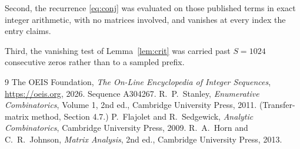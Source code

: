 \documentclass[11pt,a4paper]{article}
\theoremstyle{plain}
\theoremstyle{definition}
\begin{document}
Second, the recurrence \eqref{eq:conj} was evaluated on those published terms in exact
integer arithmetic, with no matrices involved, and vanishes at every index the entry claims.

Third, the vanishing test of Lemma~\ref{lem:crit} was carried past $S=1024$ consecutive
zeros rather than to a sampled prefix.

\begin{thebibliography}{9}
 The OEIS Foundation, \emph{The On-Line Encyclopedia of Integer
Sequences}, \url{https://oeis.org}, 2026. Sequence A304267.
 R.~P.~Stanley, \emph{Enumerative Combinatorics}, Volume 1, 2nd ed.,
Cambridge University Press, 2011. (Transfer-matrix method, Section 4.7.)
 P.~Flajolet and R.~Sedgewick, \emph{Analytic Combinatorics}, Cambridge
University Press, 2009.
 R.~A.~Horn and C.~R.~Johnson, \emph{Matrix Analysis}, 2nd ed., Cambridge
University Press, 2013.
\end{thebibliography}
\end{document}
